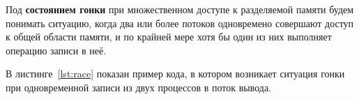 \Introduction

Под \textbf{состоянием гонки} при множественном доступе к разделяемой памяти будем понимать ситуацию, когда два или более потоков одновремено совершают доступ к общей области памяти, и по крайней мере хотя бы один из них выполняет операцию записи в неё. 

В листинге~\ref{lst:race} показан пример кода, в котором возникает ситуация
гонки при одновременной записи из двух процессов в поток вывода.



